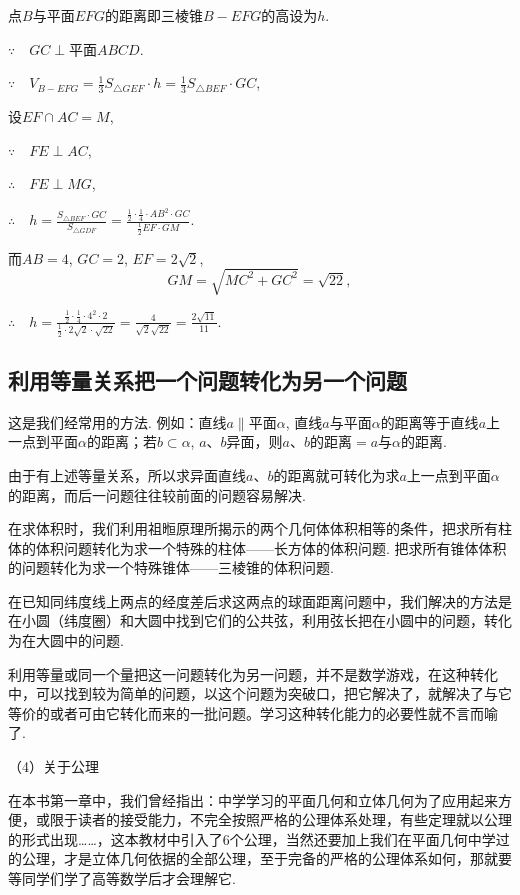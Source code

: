 \begin{solution}
    点$B$与平面$EFG$的距离即三棱锥$B-EFG$的高设为$h$. 
    
    $\because\quad  GC\perp \text{平面} ABCD$.

$\because\quad V_{B-EFG}=\frac{1}{3}S_{\triangle GEF}\cdot  h=\frac{1}{3}S_{\triangle BEF}\cdot  GC$,

设$EF\cap AC=M$,

$\because\quad FE\perp AC$,

$\therefore\quad FE\perp MG$,

$\therefore\quad h=\frac{S_{\triangle BEF}\cdot GC}{S_{\triangle GDF}}=\frac{\frac{1}{2}\cdot \frac{1}{4}\cdot AB^{2}\cdot GC}{\frac{1}{2}EF\cdot GM}$.

而$AB=4$,  $GC=2$,  $EF=2\sqrt{2}$,
\[
GM=\sqrt{MC^{2}+GC^{2}}=\sqrt{22},
\] 

$\therefore\quad h=\frac{\frac{1}{2}\cdot \frac{1}{4}\cdot  4^{2}\cdot  2}{\frac{1}{2}\cdot  2\sqrt{2}\cdot \sqrt{22}}=\frac{4}{\sqrt{2}\sqrt{22}}=\frac{2\sqrt{11}}{11}$.
\end{solution}


\subsection*{利用等量关系把一个问题转化为另一个问题}

这是我们经常用的方法. 例如：直线$a\parallel$平面$\alpha$, 直线$a$与平面$\alpha$的距离等于直线$a$上一点到平面$\alpha$的距离；若$b\subset \alpha$,  $a$、$b$异面，则$a$、$b$的距离$=a$与$\alpha$的距离.

由于有上述等量关系，所以求异面直线$a$、$b$的距离就可转化为求$a$上一点到平面$\alpha$的距离，而后一问题往往较前面的问题容易解决.

在求体积时，我们利用祖暅原理所揭示的两个几何体体积相等的条件，把求所有柱体的体积问题转化为求一个特殊的柱体——长方体的体积问题. 把求所有锥体体积的问题转化为求一个特殊锥体——三棱锥的体积问题.

在已知同纬度线上两点的经度差后求这两点的球面距离问题中，我们解决的方法是在小圆（纬度圈）和大圆中找到它们的公共弦，利用弦长把在小圆中的问题，转化为在大圆中的问题.

利用等量或同一个量把这一问题转化为另一问题，并不是数学游戏，在这种转化中，可以找到较为简单的问题，以这个问题为突破口，把它解决了，就解决了与它等价的或者可由它转化而来的一批问题。学习这种转化能力的必要性就不言而喻了.


（4）关于公理

在本书第一章中，我们曾经指出：中学学习的平面几何和立体几何为了应用起来方便，或限于读者的接受能力，不完全按照严格的公理体系处理，有些定理就以公理的形式出现……，这本教材中引入了6个公理，当然还要加上我们在平面几何中学过的公理，才是立体几何依据的全部公理，至于完备的严格的公理体系如何，那就要等同学们学了高等数学后才会理解它.

